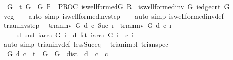\begin{isabellebody}
\ \ {\isachardoublequoteopen}{\isasymforall}G{\isachardot}\ {\isasymGamma}\ {\isasymturnstile}\isactrlsub t\ {\isasymlbrace}{\isasymacute}G\ {\isacharequal}\ G{\isasymrbrace}\ {\isasymacute}R\ {\isacharcolon}{\isacharequal}{\isacharequal}\ PROC\ is{\isacharunderscore}wellformed{\isacharparenleft}{\isasymacute}G{\isacharparenright}\ {\isasymlbrace}{\isasymacute}R\ {\isacharequal}\ is{\isacharunderscore}wellformed{\isacharunderscore}inv\ G\ {\isacharparenleft}iedge{\isacharunderscore}cnt\ G{\isacharparenright}{\isasymrbrace}{\isachardoublequoteclose}\isanewline
%
\isadelimproof
\ \ %
\endisadelimproof
%
\isatagproof
{}\isamarkupfalse%
\ vcg\isanewline
\ \ \isamarkupfalse%
\ {\isacharparenleft}auto\ simp{\isacharcolon}\ is{\isacharunderscore}wellformed{\isacharunderscore}inv{\isacharunderscore}step{\isacharparenright}\isanewline
\ \ \isamarkupfalse%
\ {\isacharparenleft}auto\ simp{\isacharcolon}\ is{\isacharunderscore}wellformed{\isacharunderscore}inv{\isacharunderscore}def{\isacharparenright}\ \isanewline
{}\isamarkupfalse%
%
\endisatagproof
{\isafoldproof}%
%
\isadelimproof
\isanewline
%
\endisadelimproof
\isanewline
{}\isamarkupfalse%
\ trian{\isacharunderscore}inv{\isacharunderscore}step{\isacharcolon}\isanewline
\ \ {\isachardoublequoteopen}trian{\isacharunderscore}inv\ G\ d\ c\ {\isacharparenleft}Suc\ i{\isacharparenright}\ {\isasymlongleftrightarrow}\ trian{\isacharunderscore}inv\ G\ d\ c\ i\isanewline
\ \ \ \ {\isasymand}\ d\ {\isacharparenleft}snd\ {\isacharparenleft}iarcs\ G\ i{\isacharparenright}{\isacharparenright}\ {\isasymle}\ d\ {\isacharparenleft}fst\ {\isacharparenleft}iarcs\ G\ i{\isacharparenright}{\isacharparenright}\ {\isacharplus}\ c\ i{\isachardoublequoteclose}\isanewline
%
\isadelimproof
\ \ %
\endisadelimproof
%
\isatagproof
{}\isamarkupfalse%
\ {\isacharparenleft}auto\ simp{\isacharcolon}\ trian{\isacharunderscore}inv{\isacharunderscore}def\ less{\isacharunderscore}Suc{\isacharunderscore}eq{\isacharparenright}%
\endisatagproof
{\isafoldproof}%
%
\isadelimproof
\isanewline
%
\endisadelimproof
\isanewline
{}\isamarkupfalse%
\ {\isacharparenleft}\ trian{\isacharunderscore}impl{\isacharparenright}\ trian{\isacharunderscore}spec{\isacharcolon}\isanewline
\ \ {\isachardoublequoteopen}{\isasymforall}G\ d\ c{\isachardot}\ {\isasymGamma}\ {\isasymturnstile}\isactrlsub t\ {\isasymlbrace}\ {\isasymacute}G\ {\isacharequal}\ G\ {\isasymand}\ {\isasymacute}dist\ {\isacharequal}\ d\ {\isasymand}\ {\isasymacute}c\ {\isacharequal}\ c{\isasymrbrace}\isanewline

\end{isabellebody}
